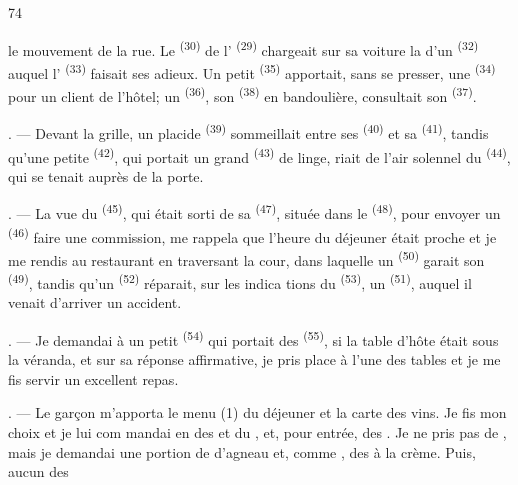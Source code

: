\begin{VUpage}[76]{74}

\VUcontinue
le mouvement de la rue. Le  \textsuperscript{(30)} de\nl
l' \textsuperscript{(29)} chargeait sur sa voiture la \nl
d'un  \textsuperscript{(32)} auquel l' \textsuperscript{(33)} faisait ses\nl
adieux. Un petit  \textsuperscript{(35)} apportait, sans\nl
se presser, une  \textsuperscript{(34)} pour un client de l'hôtel;\nl
un  \textsuperscript{(36)}, son  \textsuperscript{(38)}\nl
en bandoulière, consultait son  \textsuperscript{(37)}.

. --- Devant la grille, un placide \cc
{} \textsuperscript{(39)} sommeillait entre ses  \textsuperscript{(40)} et sa\nl
{} \textsuperscript{(41)}, tandis qu'une petite \cc
{} \textsuperscript{(42)}, qui portait un grand  \textsuperscript{(43)} de linge,\nl
riait de l'air solennel du  \textsuperscript{(44)}, qui se\nl
tenait auprès de la porte.

. --- La vue du  \textsuperscript{(45)}, qui était sorti de\nl
sa  \textsuperscript{(47)}, située dans le  \textsuperscript{(48)}, pour\nl
envoyer un  \textsuperscript{(46)} faire une commission, me\nl
rappela que l'heure du déjeuner était proche et je me\nl
rendis au restaurant en traversant la cour, dans\nl
laquelle un  \textsuperscript{(50)} garait son  \textsuperscript{(49)},\nl
tandis qu'un  \textsuperscript{(52)} réparait, sur les indica\cc
tions du  \textsuperscript{(53)}, un  \textsuperscript{(51)},\nl
auquel il venait d'arriver un accident.

. --- Je demandai à un petit  \textsuperscript{(54)} qui portait\nl
des  \textsuperscript{(55)}, si la table d'hôte était sous la véranda,\nl
et sur sa réponse affirmative, je pris place à l'une des\nl
tables et je me fis servir un excellent repas.

. --- Le garçon m'apporta le menu (1) du déjeuner\nl
et la carte des vins. Je fis mon choix et je lui com\cc
mandai en  des  et du\nl
{}, et, pour entrée, des \nl
{}. Je ne pris pas de , mais je demandai\nl
une portion de  d'agneau et, comme ,\nl
des  à la crème. Puis, aucun des 
\parplein
\end{VUpage}

